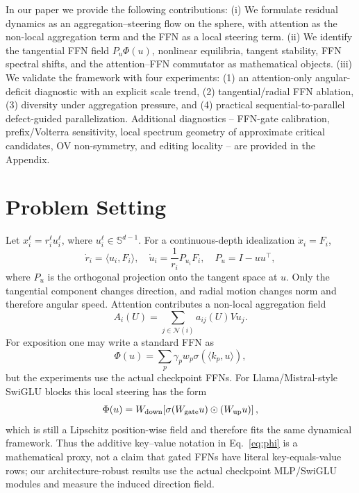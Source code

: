 \documentclass[11pt]{article}
\newcommand{\Sph}{\mathbb{S}}
\begin{document}
In our paper we provide the following contributions: (i) We formulate residual dynamics as an aggregation--steering flow on the sphere, with attention as the non-local aggregation term and the FFN as a local steering term. (ii) We identify the tangential FFN field $P_u\Phi(u)$, nonlinear equilibria, tangent stability, FFN spectral shifts, and the attention--FFN commutator as mathematical objects. (iii) We validate the framework with four experiments: (1) an attention-only angular-deficit diagnostic with an explicit scale trend, (2) tangential/radial FFN ablation, (3) diversity under aggregation pressure, and (4) practical sequential-to-parallel defect-guided parallelization. Additional diagnostics -- FFN-gate calibration, prefix/Volterra sensitivity, local spectrum geometry of approximate critical candidates, OV non-symmetry, and editing locality -- are provided in the Appendix.

\section{Problem Setting}

Let $x_i^\ell=r_i^\ell u_i^\ell$, where $u_i^\ell\in\Sph^{d-1}$. For a continuous-depth idealization $\dot x_i=F_i$,
\begin{equation}
\dot r_i=\langle u_i,F_i\rangle,\quad
\dot u_i=\frac1{r_i}P_{u_i}F_i,\quad P_u=I-uu^\top,
\label{eq:split}
\end{equation}
where $P_u$ is the orthogonal projection onto the tangent space at $u$. Only the tangential component changes direction, and radial motion changes norm and therefore angular speed. Attention contributes a non-local aggregation field
\begin{equation}
A_i(U)=\sum_{j\in\mathcal N(i)}a_{ij}(U)Vu_j .
\end{equation}
For exposition one may write a standard FFN as
\begin{equation}
\Phi(u)=\sum_p\gamma_p w_p\sigma(\langle k_p,u\rangle),
\label{eq:phi}
\end{equation}
but the experiments use the actual checkpoint FFNs. For Llama/Mistral-style SwiGLU blocks \citep{shazeer2020glu,jiang2023mistral,dubey2024llama} this local steering has the form
\begin{equation}
\Phi(u)=W_{\rm down}\!\left[\sigma(W_{\rm gate}u)\odot(W_{\rm up}u)\right],
\end{equation}
which is still a Lipschitz position-wise field and therefore fits the same dynamical
framework. Thus the additive key--value notation in Eq.~\eqref{eq:phi} is a
mathematical proxy, not a claim that gated FFNs have literal key-equals-value rows;
our architecture-robust results use the actual checkpoint MLP/SwiGLU modules and
measure the induced direction field.
\end{document}
